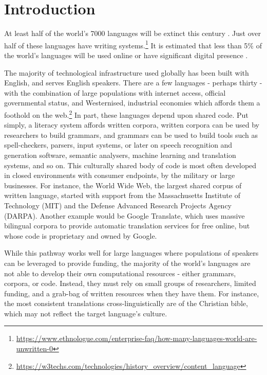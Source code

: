 \section{Introduction}\label{sec:intro}

At least half of the world's 7000 languages will be extinct this century \citep[p. 27]{grenoble_2011}. Just over half of these languages have writing systems.\footnote{\href{https://www.ethnologue.com/enterprise-faq/how-many-languages-world-are-unwritten-0}{https://www.ethnologue.com/enterprise-faq/how-many-languages-world-are-unwritten-0}} It is estimated that less than 5\% of the world's languages will be used online or have significant digital presence \citep{kornai2013digital}.

The majority of technological infrastructure used globally has been built with English, and serves English speakers. There are a few languages - perhaps thirty - with the combination of large populations with internet access, official governmental status, and Westernised, industrial economies which affords them a foothold on the web.\footnote{\href{https://w3techs.com/technologies/history\_overview/content\_language}{https://w3techs.com/technologies/history\_overview/content\_language}}
In part, these languages depend upon shared code. Put simply, a literacy system affords written corpora, written corpora can be used by researchers to build grammars, and grammars can be used to build tools such as spell-checkers, parsers, input systems, or later on speech recognition and generation software, semantic analysers, machine learning and translation systems, and so on. This culturally shared body of code is most often developed in closed environments with consumer endpoints, by the military or large businesses. For instance, the World Wide Web, the largest shared corpus of written language, started with support from  the Massachusetts Institute of Technology (MIT) and the Defense Advanced Research Projects Agency (DARPA). Another example would be Google Translate, which uses massive bilingual corpora to provide automatic translation services for free online, but whose code is proprietary and owned by Google.

While this pathway works well for large languages where populations of speakers can be leveraged to provide funding, the majority of the world's languages are not able to develop their own computational resources - either grammars, corpora, or code. Instead, they must rely on small groups of researchers, limited funding, and a grab-bag of written resources when they have them. For instance, the most consistent translations cross-linguistically are of the Christian bible, which may not reflect the target language's culture.

